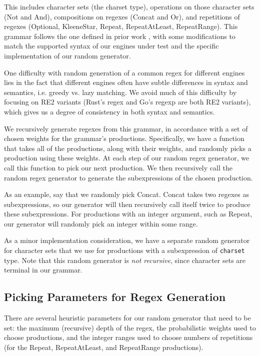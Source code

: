 \documentclass[acmsmall,nonacm,screen]{acmart}
\begin{document}
This includes character sets (the charset type), operations on those character sets (Not and And), compositions on regexes (Concat and Or), and repetitions of regexes (Optional, KleeneStar, Repeat, RepeatAtLeast, RepeatRange). This grammar follows the one defined in prior work \cite{chen2020multi}, with some modifications to match the supported syntax of our engines under test and the specific implementation of our random generator.

One difficulty with random generation of a common regex for different engines lies in the fact that different engines often have subtle differences in syntax and semantics, i.e. greedy vs. lazy matching. We avoid much of this difficulty by focusing on RE2 variants (Rust's regex and Go's regexp are both RE2 variants), which gives us a degree of consistency in both syntax and semantics.

We recursively generate regexes from this grammar, in accordance with a set of chosen weights for the grammar's productions. Specifically, we have a function that takes all of the productions, along with their weights, and randomly picks a production using these weights. At each step of our random regex generator, we call this function to pick our next production. We then recursively call the random regex generator to generate the subexpressions of the chosen production.

As an example, say that we randomly pick Concat. Concat takes two regexes as subexpressions, so our generator will then recursively call itself twice to produce these subexpressions. For productions with an integer argument, such as Repeat, our generator will randomly pick an integer within some range.

As a minor implementation consideration, we have a separate random generator for character sets that we use for productions with a  subexpression of \texttt{charset} type. Note that this random generator is \textit{not recursive}, since character sets are terminal in our grammar.

\subsection{Picking Parameters for Regex Generation}
There are several heuristic parameters for our random generator that need to be set: the maximum (recursive) depth of the regex, the probabilistic weights used to choose productions, and the integer ranges used to choose numbers of repetitions (for the Repeat, RepeatAtLeast, and RepeatRange productions).
\end{document}
